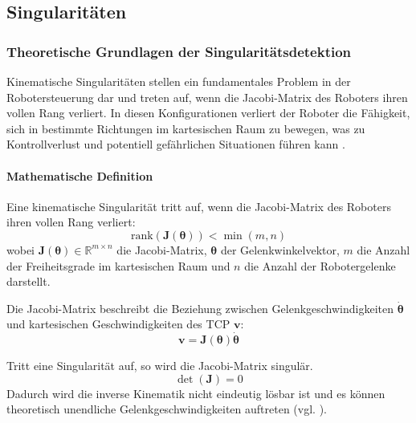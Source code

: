 \subsection{Singularitäten}
\label{ssec:Singularitaeten}

\subsubsection{Theoretische Grundlagen der Singularitätsdetektion}
\label{sssec:Theorie_Singularitaeten}

Kinematische Singularitäten stellen ein fundamentales Problem in der
Robotersteuerung dar und treten auf, wenn die Jacobi-Matrix des Roboters ihren
vollen Rang verliert. In diesen Konfigurationen verliert der Roboter die
Fähigkeit, sich in bestimmte Richtungen im kartesischen Raum zu bewegen, was zu
Kontrollverlust und potentiell gefährlichen Situationen führen kann
\cite{siciliano2010robotics, craig2005introduction}.

\paragraph{Mathematische Definition}
Eine kinematische Singularität tritt auf, wenn die Jacobi-Matrix des Roboters
ihren vollen Rang verliert:
\begin{equation}
    \text{rank}(\mathbf{J}(\boldsymbol{\theta})) < \min(m, n)
    \label{eq:singularity_condition}
\end{equation}
wobei $\mathbf{J}(\boldsymbol{\theta}) \in \mathbb{R}^{m \times n}$ die Jacobi-Matrix, $\boldsymbol{\theta}$ der Gelenkwinkelvektor, $m$ die Anzahl der Freiheitsgrade im kartesischen Raum und $n$ die Anzahl der Robotergelenke darstellt.

Die Jacobi-Matrix beschreibt die Beziehung zwischen Gelenkgeschwindigkeiten
$\dot{\boldsymbol{\theta}}$ und kartesischen Geschwindigkeiten des TCP
$\mathbf{v}$:
\begin{equation}
    \mathbf{v} = \mathbf{J}(\boldsymbol{\theta}) \dot{\boldsymbol{\theta}}
    \label{eq:jacobian_velocity}
\end{equation}

Tritt eine Singularität auf, so wird die Jacobi-Matrix singulär.
\begin{equation}
    \det(\mathbf{J}) = 0
    \label{eq:jacobian_singularity}
\end{equation}
Dadurch wird die inverse Kinematik nicht eindeutig lösbar
ist und es können theoretisch unendliche Gelenkgeschwindigkeiten auftreten (vgl. \cite{nakamura1991advanced}).

